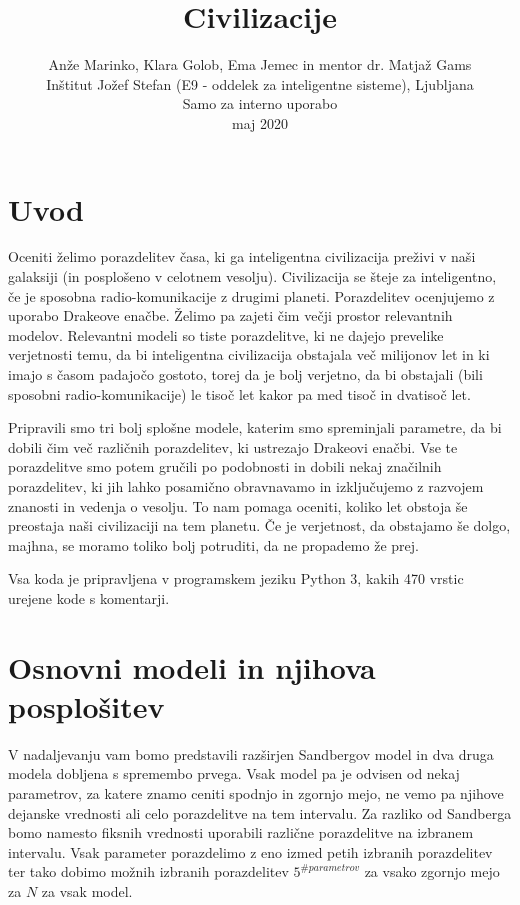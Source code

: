 \documentclass[a4paper]{IEEEtran}
\title{Civilizacije}
\author{Anže Marinko, Klara Golob, Ema Jemec in mentor dr. Matjaž Gams \\ Inštitut Jožef Stefan (E9 - oddelek za inteligentne sisteme), Ljubljana \\ Samo za interno uporabo \\ maj 2020}
\begin{document}
\maketitle
\tableofcontents

\section{Uvod}

Oceniti želimo porazdelitev časa, ki ga inteligentna civilizacija preživi v naši galaksiji (in posplošeno v celotnem vesolju). Civilizacija se šteje za inteligentno, če je sposobna radio-komunikacije z drugimi planeti. Porazdelitev ocenjujemo z uporabo Drakeove enačbe. Želimo pa zajeti čim večji prostor relevantnih modelov. Relevantni modeli so tiste porazdelitve, ki ne dajejo prevelike verjetnosti temu, da bi inteligentna civilizacija obstajala več milijonov let in ki imajo s časom padajočo gostoto, torej da je bolj verjetno, da bi obstajali (bili sposobni radio-komunikacije) le tisoč let kakor pa med tisoč in dvatisoč let.

Pripravili smo tri bolj splošne modele, katerim smo spreminjali parametre, da bi dobili čim več različnih porazdelitev, ki ustrezajo Drakeovi enačbi. Vse te porazdelitve smo potem gručili po podobnosti in dobili nekaj značilnih porazdelitev, ki jih lahko posamično obravnavamo in izključujemo z razvojem znanosti in vedenja o vesolju. To nam pomaga oceniti, koliko let obstoja še preostaja naši civilizaciji na tem planetu. Če je verjetnost, da obstajamo še dolgo, majhna, se moramo toliko bolj potruditi, da ne propademo že prej.

Vsa koda je pripravljena v programskem jeziku Python 3, kakih 470 vrstic urejene kode s komentarji.

\section{Osnovni modeli in njihova posplošitev}

V nadaljevanju vam bomo predstavili razširjen Sandbergov model in dva druga modela dobljena s spremembo prvega. Vsak model pa je odvisen od nekaj parametrov, za katere znamo ceniti spodnjo in zgornjo mejo, ne vemo pa njihove dejanske vrednosti ali celo porazdelitve na tem intervalu. Za razliko od Sandberga bomo namesto fiksnih vrednosti uporabili različne porazdelitve na izbranem intervalu. Vsak parameter porazdelimo z eno izmed petih izbranih porazdelitev ter tako dobimo možnih izbranih porazdelitev $5^{\#parametrov}$ za vsako zgornjo mejo za $N$ za vsak model.
\end{document}
